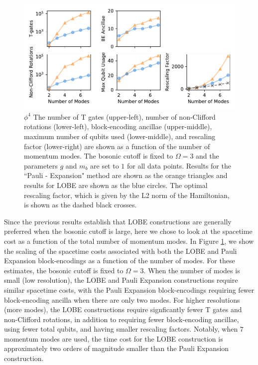 \begin{figure}
    \label{fig:phi4}
    \includegraphics[width = 16cm]{figures/phi4-resolution-3.pdf}
    \caption{
        \textbf{$\phi^4$}
        The number of T gates (upper-left), number of non-Clifford rotations (lower-left), block-encoding ancillae (upper-middle), maximum number of qubits used (lower-middle), and rescaling factor (lower-right) are shown as a function of the number of momentum modes.
        The bosonic cutoff is fixed to $\Omega = 3$ and the parameters $g$ and $m_b$ are set to $1$ for all data points.
        Results for the ``Pauli - Expansion" method are shown as the orange triangles and results for LOBE are shown as the blue circles.
        The optimal rescaling factor, which is given by the L2 norm of the Hamiltonian, is shown as the dashed black crosses.
    }
\end{figure}

Since the previous results establish that LOBE constructions are generally preferred when the bosonic cutoff is large, here we chose to look at the spacetime cost as a function of the total number of momentum modes.
In Figure \ref{fig:phi4}, we show the scaling of the spacetime costs associated with both the LOBE and Pauli Expansion block-encodings as a function of the number of modes.
For these estimates, the bosonic cutoff is fixed to $\Omega = 3$.
When the number of modes is small (low resolution), the LOBE and Pauli Expansion constructions require similar spacetime costs, with the Pauli Expansion block-encodings requiring  fewer block-encoding ancilla when there are only two modes.
For higher resolutions (more modes), the LOBE constructions require signficantly fewer T gates and non-Clifford rotations, in addition to requiring fewer block-encoding ancillae, using fewer total qubits, and having smaller rescaling factors.
Notably, when $7$ momentum modes are used, the time cost for the LOBE construction is approximately two orders of magnitude smaller than the Pauli Expansion construction.
